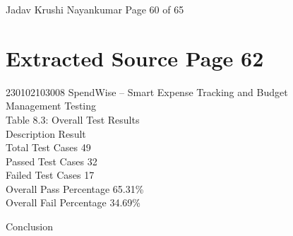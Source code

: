 \documentclass[12pt,a4paper]{report}
\begin{document}
\smallskip

\smallskip

\smallskip

\smallskip
Jadav Krushi Nayankumar                                                       Page 60 of 65\\ 

\clearpage
\section*{Extracted Source Page 62}
230102103008                         SpendWise – Smart Expense Tracking and Budget\\ 
Management Testing\\ 

\smallskip
Table 8.3: Overall Test Results\\ 

\smallskip
Description               Result\\ 
Total Test Cases             49\\ 
Passed Test Cases            32\\ 
Failed Test Cases            17\\ 
Overall Pass Percentage 65.31\%\\ 
Overall Fail Percentage 34.69\%\\ 

\smallskip

\smallskip

 Conclusion\\ 
\end{document}
